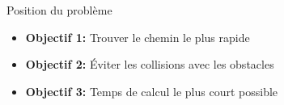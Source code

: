 \begin{frame}{Position du problème}
    \begin{itemize}
        \item \textbf{Objectif 1:} Trouver le chemin le plus rapide
        \item<2-> \textbf{Objectif 2:} Éviter les collisions avec les obstacles
        \item<3-> \textbf{Objectif 3:} Temps de calcul le plus court possible
    \end{itemize}
    \begin{figure}
    \end{figure}
\end{frame}